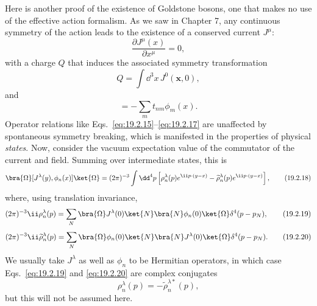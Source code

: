 Here is another proof of the existence of Goldstone bosons, one that makes no
use of the effective action formalism. As we saw in Chapter 7, any continuous
symmetry of the action leads to the existence of a conserved current $J^\mu$:
\begin{equation}
 \frac{\partial J^\mu(x)}{\partial x^\mu}=0,
 \tag{19.2.15}\label{eq:19.2.15}
\end{equation}
with a charge $Q$ that induces the associated symmetry transformation
\begin{equation}
 Q=\int \dd^3x\,J^0(\mathbf x,0),
 \tag{19.2.16}\label{eq:19.2.16}
\end{equation}
and
\begin{equation}
 [Q,\phi_n(x)]=-\sum_m t_{nm}\phi_m(x).
 \tag{19.2.17}\label{eq:19.2.17}
\end{equation}
Operator relations like Eqs.~\eqref{eq:19.2.15}--\eqref{eq:19.2.17} are
unaffected by spontaneous symmetry breaking, which is manifested in the
properties of physical \emph{states}. Now, consider the vacuum expectation
value of the commutator of the current and field. Summing over intermediate
states, this is
\begin{equation}
 \bra{\Omega}[J^\lambda(y),\phi_n(x)]\ket{\Omega}
 =(2\pi)^{-3}\int \dd^4p
 \left[\rho_n^\lambda(p)e^{\ii p\cdot(y-x)}
 -\widetilde\rho_n^\lambda(p)e^{\ii p\cdot(y-x)}\right],
 \tag{19.2.18}\label{eq:19.2.18}
\end{equation}
where, using translation invariance,
\begin{equation}
 (2\pi)^{-3}\ii\rho_n^\lambda(p)
 =\sum_N
 \bra{\Omega}J^\lambda(0)\ket{N}
 \bra{N}\phi_n(0)\ket{\Omega}
 \delta^4(p-p_N),
 \tag{19.2.19}\label{eq:19.2.19}
\end{equation}
\begin{equation}
 (2\pi)^{-3}\ii\widetilde\rho_n^\lambda(p)
 =\sum_N
 \bra{\Omega}\phi_n(0)\ket{N}
 \bra{N}J^\lambda(0)\ket{\Omega}
 \delta^4(p-p_N).
 \tag{19.2.20}\label{eq:19.2.20}
\end{equation}
We usually take $J^\lambda$ as well as $\phi_n$ to be Hermitian operators, in
which case Eqs.~\eqref{eq:19.2.19} and \eqref{eq:19.2.20} are complex
conjugates
\begin{equation}
 \rho_n^\lambda(p)=-\widetilde\rho_n^{\lambda *}(p),
 \tag{19.2.21}\label{eq:19.2.21}
\end{equation}
but this will not be assumed here.

